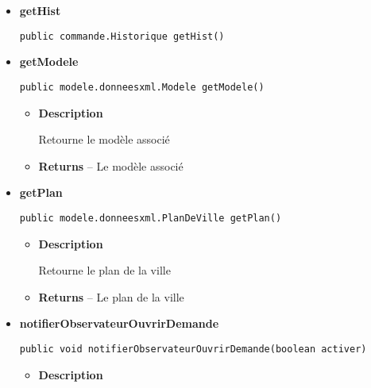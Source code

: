 \documentclass[11pt,a4paper]{report}
\begin{document}
{{{{{{\begin{itemize}
{\begin{itemize}
{Efface l'historique (vide les commandes annulable et rétablissable(?))
}
\end{itemize}
}%
\item{ 
\hypertarget{controleur.ControleurDonnees.getHist()}{{\bf  getHist}\\}
\begin{lstlisting}[frame=none]
public commande.Historique getHist()\end{lstlisting} %
}%
\item{ 
\hypertarget{controleur.ControleurDonnees.getModele()}{{\bf  getModele}\\}
\begin{lstlisting}[frame=none]
public modele.donneesxml.Modele getModele()\end{lstlisting} %
\begin{itemize}
\item{
{\bf  Description}

Retourne le modèle associé
}
\item{{\bf  Returns} -- 
Le modèle associé 
}%
\end{itemize}
}%
\item{ 
\hypertarget{controleur.ControleurDonnees.getPlan()}{{\bf  getPlan}\\}
\begin{lstlisting}[frame=none]
public modele.donneesxml.PlanDeVille getPlan()\end{lstlisting} %
\begin{itemize}
\item{
{\bf  Description}

Retourne le plan de la ville
}
\item{{\bf  Returns} -- 
Le plan de la ville 
}%
\end{itemize}
}%
\item{ 
\hypertarget{controleur.ControleurDonnees.notifierObservateurOuvrirDemande(boolean)}{{\bf  notifierObservateurOuvrirDemande}\\}
\begin{lstlisting}[frame=none]
public void notifierObservateurOuvrirDemande(boolean activer)\end{lstlisting} %
\begin{itemize}
\item{
{\bf  Description}

}
\end{itemize}}
\end{itemize}}}}}}}
\end{document}
